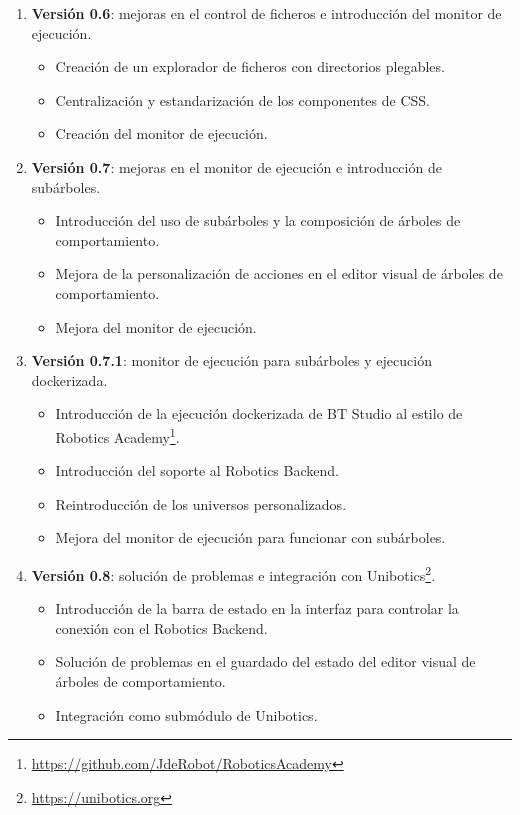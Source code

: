 \begin{enumerate}
    \item \textbf{Versión 0.6}: mejoras en el control de ficheros e introducción del monitor de ejecución. 
    \begin{itemize}
        \item Creación de un explorador de ficheros con directorios plegables.
        \item Centralización y estandarización de los componentes de CSS.
        \item Creación del monitor de ejecución.
    \end{itemize}

    \item \textbf{Versión 0.7}: mejoras en el monitor de ejecución e introducción de subárboles.
    \begin{itemize}
        \item Introducción del uso de subárboles y la composición de árboles de comportamiento.
        \item Mejora de la personalización de acciones en el editor visual de árboles de comportamiento.
        \item Mejora del monitor de ejecución.
    \end{itemize}

    \item \textbf{Versión 0.7.1}: monitor de ejecución para subárboles y ejecución dockerizada.
    \begin{itemize}
        \item Introducción de la ejecución dockerizada de BT Studio al estilo de Robotics Academy\footnote{\url{https://github.com/JdeRobot/RoboticsAcademy}}.
        \item Introducción del soporte al Robotics Backend.
        \item Reintroducción de los universos personalizados.
        \item Mejora del monitor de ejecución para funcionar con subárboles.
    \end{itemize}

    \item \textbf{Versión 0.8}: solución de problemas e integración con Unibotics\footnote{\url{https://unibotics.org}}.
    \begin{itemize}
        \item Introducción de la barra de estado en la interfaz para controlar la conexión con el Robotics Backend.
        \item Solución de problemas en el guardado del estado del editor visual de árboles de comportamiento.
        \item Integración como submódulo de Unibotics.
    \end{itemize}


\end{enumerate}
